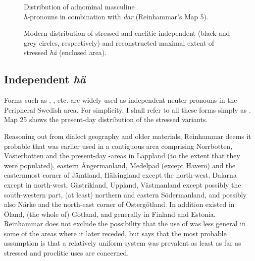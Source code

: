 \begin{figure}  
\caption{Distribution of adnominal masculine \\
\textit{h-}pronouns in combination with \textit{dar} (Reinhammar’s Map 5).}
\label{map:6:24}
\end{figure}
 
\begin{figure} 
\caption{Modern distribution of stressed and enclitic independent  (black and grey circles, respectively) and reconstructed maximal extent of stressed \textit{hä} (enclosed area).}
\label{map:6:25}  
\end{figure}

\subsection{Independent \textit{hä}}

Forms such as , , etc. are widely used as independent neuter pronouns in the Peripheral Swedish area. For simplicity, I shall refer to all these forms simply as . Map 25 shows the present-day distribution of the stressed variants. 



Reasoning out from dialect geography and older materials, Reinhammar deems it probable that  was earlier used in a contiguous area comprising Norrbotten, Västerbotten and the present-day -areas in Lappland (to the extent that they were populated), eastern Ångermanland, Medelpad (except Haverö) and the easternmost corner of Jämtland, Hälsingland except the north-west, Dalarna except in north-west, Gästrikland, Uppland, Västmanland except possibly the south-western part, (at least) northern and eastern Södermanland, and possibly also Närke and the north-east corner of Östergötland. In addition  existed in Öland, (the whole of) Gotland, and generally in Finland and Estonia. Reinhammar does not exclude the possibility that the use of  was less general in some of the areas where it later receded, but says that the most probable assumption is that a relatively uniform system was prevalent as least as far as stressed and proclitic uses are concerned.




